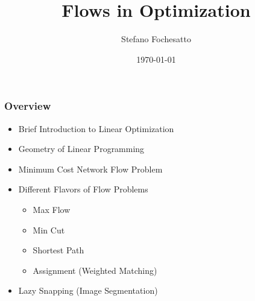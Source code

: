 \documentclass{beamer}
\title{Flows in Optimization}
\author{Stefano Fochesatto}
\institute{University of Alaska Fairbanks}
\date{\today}
\begin{document}
 \begin{frame}
\titlepage
\end{frame}




\begin{frame}
	\frametitle{Overview}
	\begin{center}
		\begin{itemize}
			\item Brief Introduction to Linear Optimization
			\vfill
			\item Geometry of Linear Programming
			\vfill
			\item Minimum Cost Network Flow Problem
			\vfill
			\item Different Flavors of Flow Problems
			\begin{itemize}
				\item Max Flow
				\item Min Cut 
				\item Shortest Path
				\item Assignment (Weighted Matching)
			\end{itemize}
			\vfill
			\item Lazy Snapping (Image Segmentation)
		\end{itemize}
	\end{center}
\end{frame}
\end{document}
